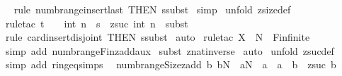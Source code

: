 \begin{isabellebody}
\isamarkupfalse%
\ {}\isanewline
{}\isamarkupfalse%
\ {\isacharparenleft}rule\ numb{\isacharunderscore}range{\isacharunderscore}insert{\isacharunderscore}last\ {\isacharbrackleft}THEN\ ssubst{\isacharbrackright}{\isacharparenright}\isanewline
{}\isamarkupfalse%
\ simp\isanewline
{}\isamarkupfalse%
\ {\isacharparenleft}unfold\ zsize{\isacharunderscore}def{\isacharparenright}\isanewline
{}\isamarkupfalse%
\ {\isacharparenleft}rule{\isacharunderscore}tac\ t\ {\isacharequal}\ {\isachardoublequoteopen}{}\ {\isacharplus}\ int\ n{\isachardoublequoteclose}\ \ s\ {\isacharequal}\ {\isachardoublequoteopen}zsuc\ {\isacharparenleft}int\ n{\isacharparenright}{\isachardoublequoteclose}\ \ subst{\isacharparenright}\isanewline
{}\isamarkupfalse%
\ {}\isanewline
{}\isamarkupfalse%
\ {\isacharparenleft}rule\ card{\isacharunderscore}insert{\isacharunderscore}disjoint\ {\isacharbrackleft}THEN\ ssubst{\isacharbrackright}{\isacharparenright}\isanewline
{}\isamarkupfalse%
\ auto\isanewline
{}\isamarkupfalse%
\ {\isacharparenleft}rule{\isacharunderscore}tac\ X\ {\isacharequal}\ {\isachardoublequoteopen}{\isacharpercent}N{\isachardoublequoteclose}\ \ Fin{\isacharunderscore}finite{\isacharparenright}\isanewline
{}\isamarkupfalse%
\ {\isacharparenleft}simp\ add{\isacharcolon}\ numb{\isacharunderscore}range{\isacharunderscore}Fin{\isacharunderscore}zadd{\isacharunderscore}aux{\isacharparenright}\isanewline
{}\isamarkupfalse%
\ {\isacharparenleft}subst\ znat{\isacharunderscore}inverse{\isacharparenright}\isanewline
{}\isamarkupfalse%
\ auto\isanewline
{}\isamarkupfalse%
\ {\isacharparenleft}unfold\ zsuc{\isacharunderscore}def{\isacharparenright}\isanewline
{}\isamarkupfalse%
\ {\isacharparenleft}simp\ add{\isacharcolon}\ ring{\isacharunderscore}eq{\isacharunderscore}simps{\isacharparenright}{\isacharplus}\isanewline
{}\isamarkupfalse%
%
\endisatagproof
{\isafoldproof}%
%
\isadelimproof
\isanewline
%
\endisadelimproof
\isanewline
\isanewline
\isanewline
{}\isamarkupfalse%
\ \ numb{\isacharunderscore}range{\isacharunderscore}Size{\isacharunderscore}zadd{}{\isacharcolon}\ {\isachardoublequoteopen}{\isacharbang}{\isacharbang}b{\isachardot}\ {\isacharbrackleft}{\isacharbar}b{\isacharcolon}{\isacharpercent}N\ {\isacharsemicolon}\ a{\isacharcolon}{\isacharpercent}N{\isacharbar}{\isacharbrackright}\ {\isacharequal}{\isacharequal}{\isachargreater}\ {\isacharhash}{\isacharparenleft}a\ {\isachardot}{\isachardot}\ {\isacharparenleft}a\ {\isacharplus}\ b{\isacharparenright}{\isacharparenright}\ {\isacharequal}\ zsuc\ b{\isachardoublequoteclose}\isanewline

\end{isabellebody}
